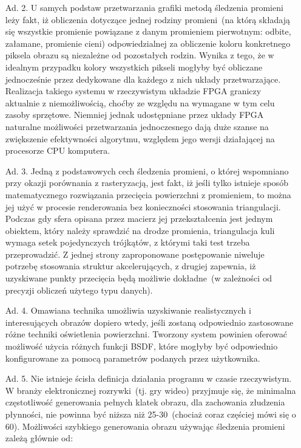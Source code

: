 \begin{enumerate}
\item[Ad. 2.] U samych podstaw przetwarzania grafiki metodą śledzenia promieni leży fakt, iż obliczenia dotyczące jednej rodziny promieni~(na którą składają się wszystkie promienie powiązane z danym promieniem pierwotnym: odbite, załamane, promienie cieni) odpowiedzialnej za obliczenie koloru konkretnego piksela obrazu są niezależne od pozostałych rodzin. Wynika z tego, że w idealnym przypadku kolory wszystkich pikseli mogłyby być obliczane jednocześnie przez dedykowane dla każdego z nich układy przetwarzające. Realizacja takiego systemu w rzeczywistym układzie FPGA graniczy aktualnie z niemożliwością, choćby ze względu na wymagane w tym celu zasoby sprzętowe. Niemniej jednak udostępniane przez układy FPGA naturalne możliwości przetwarzania jednoczesnego dają duże szanse na zwiększenie efektywności algorytmu, względem jego wersji działającej na procesorze CPU komputera.
\item[Ad. 3.] Jedną z podstawowych cech śledzenia promieni, o której wspomniano przy okazji porównania z rasteryzacją, jest fakt, iż jeśli tylko istnieje sposób matematycznego rozwiązania przecięcia powierzchni z promieniem, to można jej użyć w procesie renderowania bez konieczności stosowania triangulacji. Podczas gdy sfera opisana przez macierz jej przekształcenia jest jednym obiektem, który należy sprawdzić na drodze promienia, triangulacja kuli wymaga setek pojedynczych trójkątów, z którymi taki test trzeba przeprowadzić. Z jednej strony zaproponowane postępowanie niweluje potrzebę stosowania struktur akcelerujących, z drugiej zapewnia, iż uzyskiwane punkty przecięcia będą możliwie dokładne~(w zależności od precyzji obliczeń użytego typu danych).
\item[Ad. 4.] Omawiana technika umożliwia uzyskiwanie realistycznych i interesujących obrazów dopiero wtedy, jeśli zostaną odpowiednio zastosowane różne techniki oświetlenia powierzchni. Tworzony system powinien oferować możliwość użycia różnych funkcji BSDF, które mogłyby być odpowiednio konfigurowane za pomocą parametrów podanych przez użytkownika.
\item[Ad. 5.] Nie istnieje ścisła definicja działania programu w czasie rzeczywistym. W branży elektronicznej rozrywki~(tj. gry wideo) przyjmuje się, że minimalna częstotliwość generowania pełnych klatek obrazu, dla zachowania złudzenia płynności, nie powinna być niższa niż 25-30~(chociaż coraz częściej mówi się o 60). Możliwości szybkiego generowania obrazu używając śledzenia promieni zależą głównie od:
\begin{itemize}

\end{itemize}
\end{enumerate}
